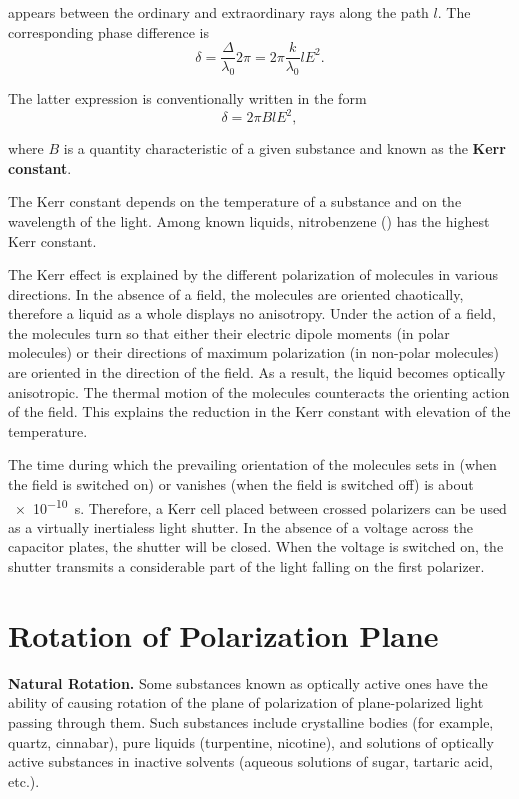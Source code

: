 \noindent
appears between the ordinary and extraordinary rays along the path $l$.
The corresponding phase difference is
\begin{equation*}
	\delta = \frac{\Delta}{\lambda_0} 2\pi = 2\pi \frac{k}{\lambda_0} l E^2.
\end{equation*}

\noindent
The latter expression is conventionally written in the form
\begin{equation}\label{eq:19_21}
	\delta = 2\pi B l E^2,
\end{equation}

\noindent
where $B$ is a quantity characteristic of a given substance and known as the \textbf{Kerr constant}.

The Kerr constant depends on the temperature of a substance and on the wavelength of the light.
Among known liquids, nitrobenzene () has the highest Kerr constant.

The Kerr effect is explained by the different polarization of molecules in various directions.
In the absence of a field, the molecules are oriented chaotically, therefore a liquid as a whole displays no anisotropy.
Under the action of a field, the molecules turn so that either their electric dipole moments (in polar molecules) or their directions of maximum polarization (in non-polar molecules) are oriented
in the direction of the field.
As a result, the liquid becomes optically anisotropic.
The thermal motion of the molecules counteracts the orienting action of the field.
This explains the reduction in the Kerr constant with elevation of the temperature.

The time during which the prevailing orientation of the molecules sets in (when the field is switched on) or vanishes (when the field is switched off) is about \SI{e-10}{s}.
Therefore, a Kerr cell placed between crossed polarizers can be used as a virtually inertialess light shutter.
In the absence of a voltage across the capacitor plates, the shutter will be closed.
When the voltage is switched on, the shutter transmits a considerable part of the light falling on the first polarizer.

\section{Rotation of Polarization Plane}\label{sec:19_8}

\textbf{Natural Rotation.}
Some substances known as optically active ones have the ability of causing rotation of the plane of polarization of plane-polarized light passing through them.
Such substances include crystalline bodies (for example, quartz, cinnabar), pure liquids (turpentine, nicotine), and solutions of optically active substances in inactive solvents (aqueous solutions of sugar, tartaric acid, etc.).

